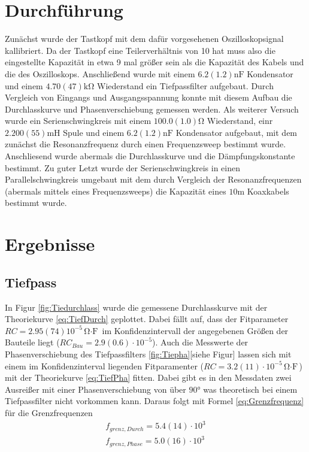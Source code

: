 \documentclass[11pt, a4paper]{article}
\begin{document}
    \section{Durchführung}
    Zunächst wurde der Tastkopf mit dem dafür vorgesehenen Oszilloskopsignal kallibriert. Da der Tastkopf eine Teilerverhältnis von 10 hat muss also die
    eingestellte Kapazität in etwa 9 mal größer sein als die Kapazität des Kabels und die des Oszilloskops. 
    Anschließend wurde mit einem $6.2(1.2) \si{\nano\farad}$ Kondensator und einem $4.70(47) \si{\kilo\ohm}$ Wiederstand ein Tiefpassfilter aufgebaut. 
    Durch Vergleich von Eingangs und Ausgangsspannung konnte mit diesem Aufbau die Durchlasskurve und Phasenverschiebung gemessen werden.
    Als weiterer Versuch wurde ein Serienschwingkreis mit einem $100.0(1.0) \si{\ohm}$ Wiederstand, einr $2.200(55) \si{\milli\henry}$ Spule und einem $6.2(1.2) \si{\nano\farad}$ Kondensator aufgebaut, mit dem zunächst die Resonanzfrequenz durch einen Frequenzsweep bestimmt wurde.
    Anschliesend wurde abermals die Durchlasskurve und die Dämpfungskonstante bestimmt.
    Zu guter Letzt wurde der Serienschwingkreis in einen Parallelschwingkreis umgebaut mit dem durch Vergleich der Resonanzfrequenzen (abermals mittels eines Frequenzsweeps) die Kapazität eines $10 \si{\metre}$ Koaxkabels bestimmt wurde.

    \section{Ergebnisse}
    \subsection{Tiefpass}
    In Figur \ref{fig:Tiedurchlass} wurde die gemessene Durchlasskurve mit der Theoriekurve \ref{eq:TiefDurch} geplottet. 
    Dabei fällt auf, dass der Fitparameter $RC = 2.95(74) 10^{-5} \si{\ohm\cdot\farad}$ im Konfidenzintervall der angegebenen Größen der Bauteile liegt ($RC_{Bau} = 2.9(0.6)\cdot 10^{-5}$).
    Auch die Messwerte der Phasenverschiebung des Tiefpassfilters \ref{fig:Tiepha}[siehe Figur] lassen sich mit einem im Konfidenzinterval liegenden Fitparamenter ($RC = 3.2(11) \cdot 10^{-5} \si{\ohm\cdot\farad}$) mit der Theoriekurve \ref{eq:TiefPha} fitten.
    Dabei gibt es in den Messdaten zwei Ausreißer mit einer Phasenverschiebung von über $90$° was theoretisch bei einem Tiefpassfilter nicht vorkommen kann.
    Daraus folgt mit Formel \ref{eq:Grenzfrequenz} für die Grenzfrequenzen
    \begin{align}
        f_{grenz,Durch} = 5.4(14) \cdot 10^{3} \\
        f_{grenz,Phase} = 5.0(16) \cdot 10^{3}
    \end{align}
\end{document}
